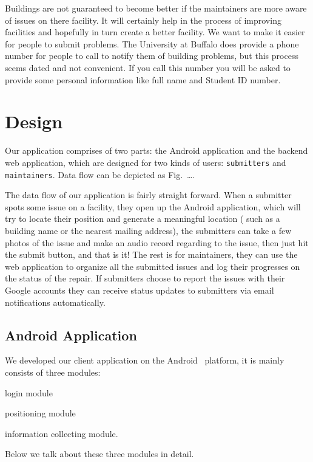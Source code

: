 \documentclass{acm_proc_article-sp}
\begin{document}
Buildings are not guaranteed to become better if the maintainers are more aware of issues on there facility. It will certainly help in the process of improving 
facilities and hopefully in turn create a better facility. We want to make it easier for people to submit problems. The University at Buffalo does provide a phone
number for people to call to notify them of building problems, but this process seems dated and not convenient. If you call this number you will be asked to provide
some personal information like full name and Student ID number.

\section{Design}
Our application comprises of two parts: the Android application and the backend web application, which are designed for two kinds of users:
\texttt{submitters} and \texttt{maintainers}. Data flow can be depicted as Fig.~\ldots.

The data flow of our application is fairly straight forward. When a submitter spots some issue on a facility, they open up the Android application, which will
try to locate their position and generate a meaningful location ( such as a building name or the nearest mailing address), the submitters can take a few photos of the issue and make an audio record regarding to the issue, then just hit the submit button, and that is it! The rest is for maintainers, they can use the web application to organize all the submitted issues and log their progresses on the status of the repair. If submitters choose to report the issues with their Google accounts they can receive status updates to submitters via email notifications automatically.

\subsection{Android Application}
We developed our client application on the Android~\cite{android} platform,
it is mainly consists of three modules:
\begin{inparaenum}
 \item login module
 \item positioning module
 \item information collecting module.
 \end{inparaenum}
 Below we talk about these three modules in detail.
\end{document}
